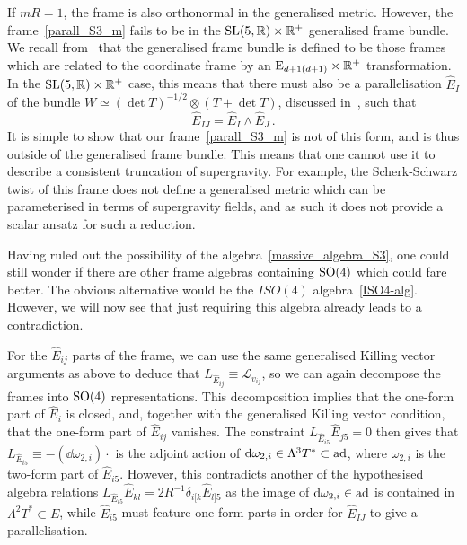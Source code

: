 \documentclass[debug]{phd}
\begin{document}
				If $mR=1$, the frame is also orthonormal in the generalised metric.
				However, the frame~\eqref{parall_S3_m} fails to be in the $\mathrm{SL}(5,\mathbb{R})\times\mathbb{R}^+$ generalised frame bundle. 
				We recall from~\cite{Coimbra:2011ky} that the generalised frame bundle is defined to be those frames which are related to the coordinate frame by an $\mathrm{E}_{d+1(d+1)}\times\mathbb{R}^+$ transformation. 
				In the $\mathrm{SL}(5,\mathbb{R})\times\mathbb{R}^+$ case, this means that there must also be a parallelisation $\hat{E}_I$ of the bundle $W \simeq (\det T)^{-1/2} \otimes (T + \det T)$, discussed in~\cite{spheres}, such that
							\begin{equation}
								\hat{E}_{IJ} = \hat{E}_I \wedge \hat{E}_J \,.
							\end{equation}
				It is simple to show that our frame~\eqref{parall_S3_m} is not of this form, and is thus outside of the generalised frame bundle. 
				This means that one cannot use it to describe a consistent truncation of supergravity. 
				For example, the Scherk-Schwarz twist of this frame does not define a generalised metric which can be parameterised in terms of supergravity fields, and as such it does not provide a scalar ansatz for such a reduction.
				
				Having ruled out the possibility of the algebra~\eqref{massive_algebra_S3}, one could still wonder if there are other frame algebras containing $\mathrm{SO}(4)$ which could fare better. 
				The obvious alternative would be the $ISO(4)$ algebra~\eqref{ISO4-alg}. 
				However, we will now see that just requiring this algebra already leads to a contradiction.

				For the $\hat{E}_{ij}$ parts of the frame, we can use the same generalised Killing vector arguments as above to deduce that $L_{\hat{E}_{ij}} \equiv \mathcal{L}_{v_{ij}}$, so we can again decompose the frames into $\mathrm{SO}(4)$ representations. 
				This decomposition implies that the one-form part of $\hat{E}_i$ is closed, and, together with the generalised Killing vector condition, that the one-form part of $\hat{E}_{ij}$ vanishes. 
				The constraint $L_{\hat{E}_{i5}} \hat{E}_{j5} = 0$ then gives that $L_{\hat{E}_{i5}} \equiv - (\dd \omega_{2,i}) \cdot$ is the adjoint action of $\mathrm{d} \omega_{2,i} \in \Lambda^3 T^* \subset \operatorname{ad}$, where $\omega_{2,i}$ is the two-form part of $\hat E_{i5}$.
				However, this contradicts another of the hypothesised algebra relations $L_{\hat{E}_{i5}}\hat{E}_{kl} = 2R^{-1}\delta_{i[k}\hat{E}_{l]5}$ as the image of $\mathrm{d} \omega_{2,i} \in \operatorname{ad}$ is contained in $\Lambda^2 T^* \subset E$, while $\hat{E}_{i5}$ must feature one-form parts in order for $\hat{E}_{IJ}$ to give a parallelisation.
\end{document}
